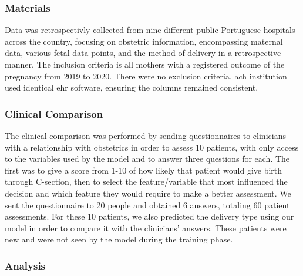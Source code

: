 
\subsubsection{Materials}
Data was retrospectivly collected from nine different public Portuguese hospitals across the country, focusing on obstetric information, encompassing maternal data, various fetal data points, and the method of delivery in a retrospective manner. The inclusion criteria is all mothers with a registered outcome of the pregnancy from 2019 to 2020. There were no exclusion criteria. ach institution used identical \ac{ehr} software, ensuring the columns remained consistent. 

\subsubsection{Clinical Comparison}
The clinical comparison was performed by sending questionnaires to clinicians with a relationship with obstetrics in order to assess 10 patients, with only access to the variables used by the model and to answer three questions for each. The first was to give a score from 1-10 of how likely that patient would give birth through C-section, then to select the feature/variable that most influenced the decision and which feature they would require to make a better assessment. We sent the questionnaire to 20 people and obtained 6 answers, totaling 60 patient assessments. For these 10 patients, we also predicted the delivery type using our model in order to compare it with the clinicians' answers. These patients were new and were not seen by the model during the training phase.

\subsubsection{Analysis}

